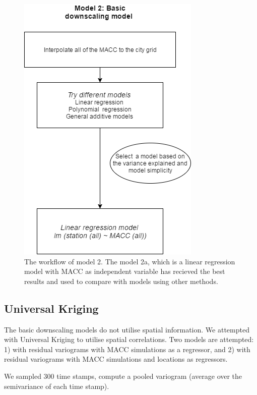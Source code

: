 \documentclass{article}
\begin{document}
\begin{figure}[tbp]
  \center
\includegraphics[scale = 0.4]{diaM2.png}
\caption{The workflow of model 2. The model 2a, which is a linear
  regression model with MACC as independent variable has recieved the
  best results and used to compare with models using other methods. }
\label{fig:LR}
\end{figure}


\subsection{Universal Kriging}
The basic downscaling models do not utilise spatial information. We
attempted with Universal Kriging to utilise spatial correlations.  Two
models are attempted: 1) with residual variograms with MACC
simulations as a regressor, and 2) with residual variograms with MACC
simulations and locations as regressors.

We sampled 300 time stamps, compute a pooled variogram (average over
the semivariance of each time stamp).
\end{document}
